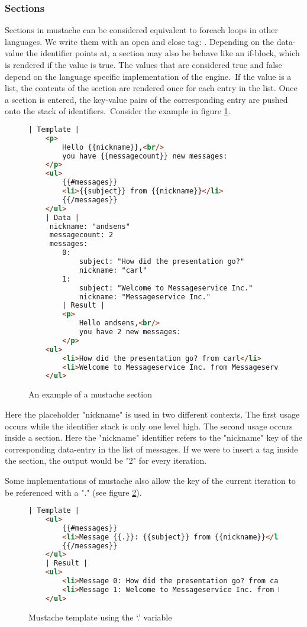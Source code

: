 \subsubsection{Sections}
Sections in mustache can be considered equivalent to foreach loops in other
languages. We write them with an open and close tag:
.
Depending on the data-value the identifier points at, a section may also be
behave like an if-block, which is rendered if the value is true. The values that
are considered true and false depend on the language specific implementation
of the engine.\
If the value is a list, the contents of the section are rendered once for each
entry in the list. Once a section is entered, the key-value pairs of the
corresponding entry are pushed onto the stack of identifiers.\
Consider the example in figure \ref{fig:section.mustache}.
\begin{figure}
	\centering
	\caption{An example of a mustache section}
	\label{fig:section.mustache}
	\begin{lstlisting}[language=HTML]
	| Template |
	<p>
		Hello {{nickname}},<br/>
		you have {{messagecount}} new messages:
	</p>
	<ul>
		{{#messages}}
		<li>{{subject}} from {{nickname}}</li>
		{{/messages}}
	</ul>
	| Data |
	 nickname: "andsens"
	 messagecount: 2
	 messages:
	 	0:
	 		subject: "How did the presentation go?"
	 		nickname: "carl"
	 	1:
	 		subject: "Welcome to Messageservice Inc."
	 		nickname: "Messageservice Inc."
		| Result |
		<p>
			Hello andsens,<br/>
			you have 2 new messages:
		</p>
	<ul>
		<li>How did the presentation go? from carl</li>
		<li>Welcome to Messageservice Inc. from Messageservice Inc.</li>
	</ul>
	\end{lstlisting}
\end{figure}
Here the placeholder "nickname" is used in two different contexts.
The first usage occurs while the identifier stack is only one level high.
The second usage occurs inside a section. Here the "nickname" identifier refers
to the "nickname" key of the corresponding data-entry in the list of messages.
If we were to insert a \inline{\{\{messagecount\}\}} tag inside the section,
the output would be "2" for every iteration.

Some implementations of mustache also allow the key of the current iteration to
be referenced with a "." (see figure \ref{fig:dot-oper.mustache}).
\begin{figure}
	\centering
	\caption{Mustache template using the `.' variable}
	\label{fig:dot-oper.mustache}
	\begin{lstlisting}[language=HTML]
	| Template |
	<ul>
		{{#messages}}
		<li>Message {{.}}: {{subject}} from {{nickname}}</li>
		{{/messages}}
	</ul>
	| Result |
	<ul>
		<li>Message 0: How did the presentation go? from carl</li>
		<li>Message 1: Welcome to Messageservice Inc. from Messageservice Inc.</li>
	</ul>
	\end{lstlisting}
\end{figure}

